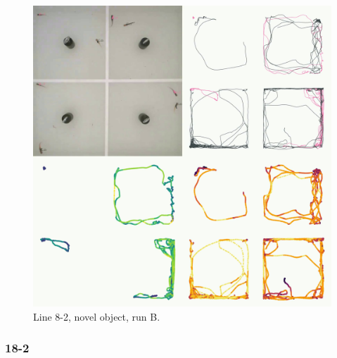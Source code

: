 \documentclass[
]{book}
\begin{document}
\begin{figure}
\includegraphics[width=1\linewidth]{figs/mikk_behaviour/four_panel_plots/novel_object_20191118_1224_8-2_R_B_300} \caption{Line 8-2, novel object, run B.}\label{fig:4p-8-2-no-B}
\end{figure}

\hypertarget{section-7}{%
\subsubsection{18-2}\label{section-7}}
\end{document}
